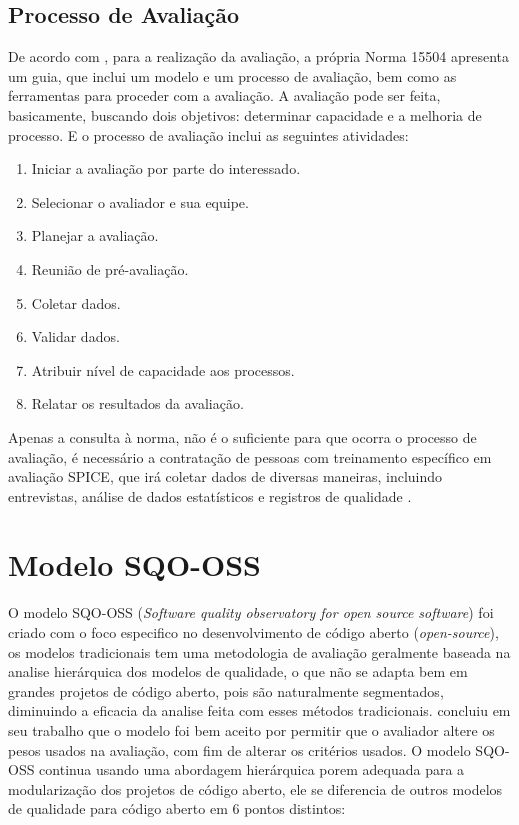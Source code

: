 \documentclass[12pt]{article}
\begin{document}
\subsection{Processo de Avaliação}
De acordo com \cite{sommerville2007engenharia}, para a realização da avaliação, a própria Norma 15504 apresenta um guia, que inclui um modelo e um processo de avaliação, bem como as ferramentas para proceder com a avaliação. A avaliação pode ser feita, basicamente, buscando dois objetivos: determinar capacidade e a melhoria de processo. E o processo de avaliação inclui as seguintes atividades:
\begin{enumerate}
    \item Iniciar a avaliação por parte do interessado.
    \item Selecionar o avaliador e sua equipe.
    \item Planejar a avaliação.
    \item Reunião de pré-avaliação.
    \item Coletar dados.
    \item Validar dados.
    \item Atribuir nível de capacidade aos processos.
    \item Relatar os resultados da avaliação.
\end{enumerate}
Apenas a consulta à norma, não é o suficiente para que ocorra o processo de avaliação, é necessário a contratação de pessoas com treinamento específico em avaliação SPICE, que irá coletar dados de diversas maneiras, incluindo entrevistas, análise de dados estatísticos e registros de qualidade \cite{sommerville2007engenharia}.

\section{Modelo SQO-OSS}
O modelo SQO-OSS (\textit{Software quality observatory for open source software}) foi criado com o foco especifico no desenvolvimento de código aberto (\textit{open-source}), os modelos tradicionais tem uma metodologia de avaliação geralmente baseada na analise hierárquica dos modelos de qualidade, o que não se adapta bem em grandes projetos de código aberto, pois são naturalmente segmentados, diminuindo a eficacia da analise feita com esses métodos tradicionais. \cite{samoladas2008sqo} concluiu em seu trabalho que o modelo foi bem aceito por permitir que o avaliador altere os pesos usados na avaliação, com fim de alterar os critérios usados. O modelo SQO-OSS continua usando uma abordagem hierárquica porem adequada para a modularização dos projetos de código aberto, ele se diferencia de outros modelos de qualidade para código aberto em 6 pontos distintos:  
\end{document}
